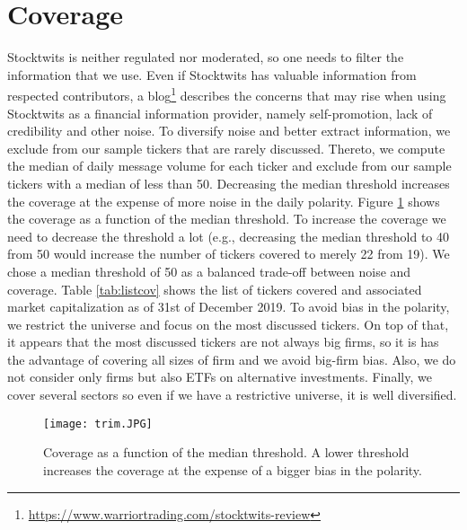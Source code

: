 \newpage 

\section{Coverage}

Stocktwits is neither regulated nor moderated, so one needs to filter the information that we use. Even if Stocktwits has valuable information from respected contributors, a blog\footnote{\url{https://www.warriortrading.com/stocktwits-review}} describes the concerns that may rise when using Stocktwits as a financial information provider, namely self-promotion, lack of credibility and other noise. To diversify noise and better extract information, we exclude from our sample tickers that are rarely discussed. Thereto, we compute the median of daily message volume for each ticker and exclude from our sample tickers with a median of less than 50. Decreasing the median threshold increases the coverage at the expense of more noise in the daily polarity. Figure \ref{fig:coverage} shows the coverage as a function of the median threshold. To increase the coverage we need to decrease the threshold a lot (e.g., decreasing the median threshold to 40 from 50 would increase the number of tickers covered to merely 22 from 19). We chose a median threshold of 50 as a balanced trade-off between noise and coverage. Table \ref{tab:listcov} shows the list of tickers covered and associated market capitalization as of 31st of December 2019. To avoid bias in the polarity, we restrict the universe and focus on the most discussed tickers. On top of that, it appears that the most discussed tickers are not always big firms, so it is has the advantage of covering all sizes of firm and we avoid big-firm bias. Also, we do not consider only firms but also ETFs on alternative investments. Finally, we cover several sectors so even if we have a restrictive universe, it is well diversified.

\begin{figure}[h]
    \centering
    \texttt{[image: trim.JPG]}
    \caption{Coverage as a function of the median threshold. A lower threshold increases the coverage at the expense of a bigger bias in the polarity.}
    \label{fig:coverage}
\end{figure}


